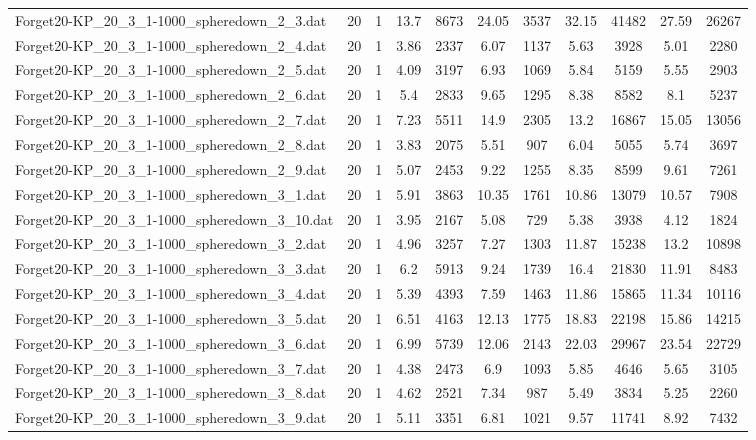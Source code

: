 \begin{table}[!ht]
\begin{tabular}{lcccccccccc}
Forget20-KP\_20\_3\_1-1000\_spheredown\_2\_3.dat & 20 & 1 & 13.7 & 8673 & 24.05 & 3537 & 32.15 & 41482 & 27.59 & 26267 \\
Forget20-KP\_20\_3\_1-1000\_spheredown\_2\_4.dat & 20 & 1 & 3.86 & 2337 & 6.07 & 1137 & 5.63 & 3928 & 5.01 & 2280 \\
Forget20-KP\_20\_3\_1-1000\_spheredown\_2\_5.dat & 20 & 1 & 4.09 & 3197 & 6.93 & 1069 & 5.84 & 5159 & 5.55 & 2903 \\
Forget20-KP\_20\_3\_1-1000\_spheredown\_2\_6.dat & 20 & 1 & 5.4 & 2833 & 9.65 & 1295 & 8.38 & 8582 & 8.1 & 5237 \\
Forget20-KP\_20\_3\_1-1000\_spheredown\_2\_7.dat & 20 & 1 & 7.23 & 5511 & 14.9 & 2305 & 13.2 & 16867 & 15.05 & 13056 \\
Forget20-KP\_20\_3\_1-1000\_spheredown\_2\_8.dat & 20 & 1 & 3.83 & 2075 & 5.51 & 907 & 6.04 & 5055 & 5.74 & 3697 \\
Forget20-KP\_20\_3\_1-1000\_spheredown\_2\_9.dat & 20 & 1 & 5.07 & 2453 & 9.22 & 1255 & 8.35 & 8599 & 9.61 & 7261 \\
Forget20-KP\_20\_3\_1-1000\_spheredown\_3\_1.dat & 20 & 1 & 5.91 & 3863 & 10.35 & 1761 & 10.86 & 13079 & 10.57 & 7908 \\
Forget20-KP\_20\_3\_1-1000\_spheredown\_3\_10.dat & 20 & 1 & 3.95 & 2167 & 5.08 & 729 & 5.38 & 3938 & 4.12 & 1824 \\
Forget20-KP\_20\_3\_1-1000\_spheredown\_3\_2.dat & 20 & 1 & 4.96 & 3257 & 7.27 & 1303 & 11.87 & 15238 & 13.2 & 10898 \\
Forget20-KP\_20\_3\_1-1000\_spheredown\_3\_3.dat & 20 & 1 & 6.2 & 5913 & 9.24 & 1739 & 16.4 & 21830 & 11.91 & 8483 \\
Forget20-KP\_20\_3\_1-1000\_spheredown\_3\_4.dat & 20 & 1 & 5.39 & 4393 & 7.59 & 1463 & 11.86 & 15865 & 11.34 & 10116 \\
Forget20-KP\_20\_3\_1-1000\_spheredown\_3\_5.dat & 20 & 1 & 6.51 & 4163 & 12.13 & 1775 & 18.83 & 22198 & 15.86 & 14215 \\
Forget20-KP\_20\_3\_1-1000\_spheredown\_3\_6.dat & 20 & 1 & 6.99 & 5739 & 12.06 & 2143 & 22.03 & 29967 & 23.54 & 22729 \\
Forget20-KP\_20\_3\_1-1000\_spheredown\_3\_7.dat & 20 & 1 & 4.38 & 2473 & 6.9 & 1093 & 5.85 & 4646 & 5.65 & 3105 \\
Forget20-KP\_20\_3\_1-1000\_spheredown\_3\_8.dat & 20 & 1 & 4.62 & 2521 & 7.34 & 987 & 5.49 & 3834 & 5.25 & 2260 \\
Forget20-KP\_20\_3\_1-1000\_spheredown\_3\_9.dat & 20 & 1 & 5.11 & 3351 & 6.81 & 1021 & 9.57 & 11741 & 8.92 & 7432 \\

\end{tabular}
\end{table}

